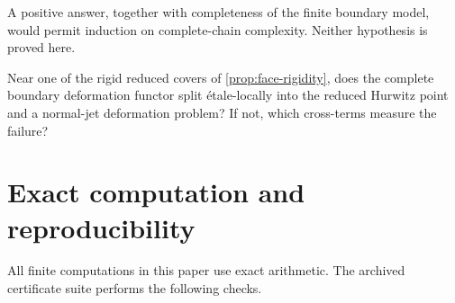 \documentclass[11pt,reqno]{amsart}
\begin{document}
A positive answer, together with completeness of the finite boundary model,
would permit induction on complete-chain complexity.  Neither hypothesis is
proved here.

\begin{question}
\label{q:splitting}
Near one of the rigid reduced covers of
\cref{prop:face-rigidity}, does the complete boundary deformation functor
split étale-locally into the reduced Hurwitz point and a normal-jet
deformation problem?  If not, which cross-terms measure the failure?
\end{question}



\section{Exact computation and reproducibility}
\label{sec:computation}

All finite computations in this paper use exact arithmetic.  The archived
certificate suite performs the following checks.
\end{document}
